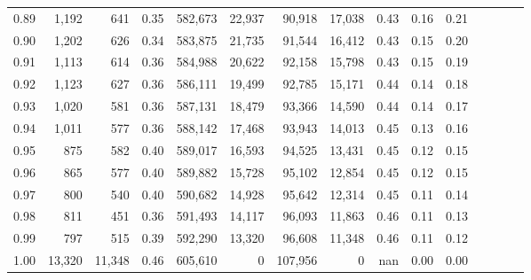 \begin{tabular}{rrrcrrrrrrrrrrr}
0.89 &   1,192 &     641 &                                       0.35 &  582,673 &   22,937 &   90,918 &   17,038 &  0.43 &  0.16 &                         0.21 \\
0.90 &   1,202 &     626 &                                       0.34 &  583,875 &   21,735 &   91,544 &   16,412 &  0.43 &  0.15 &                         0.20 \\
0.91 &   1,113 &     614 &                                       0.36 &  584,988 &   20,622 &   92,158 &   15,798 &  0.43 &  0.15 &                         0.19 \\
0.92 &   1,123 &     627 &                                       0.36 &  586,111 &   19,499 &   92,785 &   15,171 &  0.44 &  0.14 &                         0.18 \\
0.93 &   1,020 &     581 &                                       0.36 &  587,131 &   18,479 &   93,366 &   14,590 &  0.44 &  0.14 &                         0.17 \\
0.94 &   1,011 &     577 &                                       0.36 &  588,142 &   17,468 &   93,943 &   14,013 &  0.45 &  0.13 &                         0.16 \\
0.95 &     875 &     582 &                                       0.40 &  589,017 &   16,593 &   94,525 &   13,431 &  0.45 &  0.12 &                         0.15 \\
0.96 &     865 &     577 &                                       0.40 &  589,882 &   15,728 &   95,102 &   12,854 &  0.45 &  0.12 &                         0.15 \\
0.97 &     800 &     540 &                                       0.40 &  590,682 &   14,928 &   95,642 &   12,314 &  0.45 &  0.11 &                         0.14 \\
0.98 &     811 &     451 &                                       0.36 &  591,493 &   14,117 &   96,093 &   11,863 &  0.46 &  0.11 &                         0.13 \\
0.99 &     797 &     515 &                                       0.39 &  592,290 &   13,320 &   96,608 &   11,348 &  0.46 &  0.11 &                         0.12 \\
1.00 &  13,320 &  11,348 &                                       0.46 &  605,610 &        0 &  107,956 &        0 &   nan &  0.00 &                         0.00 \\
\bottomrule
\end{tabular}

